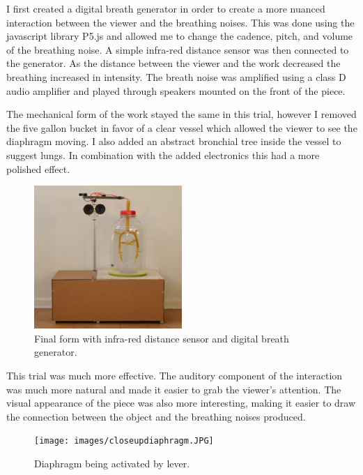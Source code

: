 \documentclass[letterpaper]{article}
\begin{document}
I first created a digital breath generator in order to create a more nuanced interaction between the viewer and the breathing noises. This was done using the javascript library P5.js and allowed me to change the cadence, pitch, and volume of the breathing noise. A simple infra-red distance sensor was then connected to the generator. As the distance between the viewer and the work decreased the breathing increased in intensity. The breath noise was amplified using a class D audio amplifier and played through speakers mounted on the front of the piece. 
 

The mechanical form of the work stayed the same in this trial, however I removed the five gallon bucket in favor of a clear vessel which allowed the viewer to see the diaphragm moving. I also added an abstract bronchial tree inside the vessel to suggest lungs. In combination with the added electronics this had a more polished effect.

\begin{figure}[h]
\includegraphics[width=0.5\textwidth]{images/finaltrial.JPG}
\caption{Final form with infra-red distance sensor and digital breath generator.}
\end{figure}


This trial was much more effective. The auditory component of the interaction was much more natural and made it easier to grab the viewer's attention. The visual appearance of the piece was also more interesting, making it easier to draw the connection between the object and the breathing noises produced. 

\begin{figure}[h]
\texttt{[image: images/closeupdiaphragm.JPG]}
\caption{Diaphragm being activated by lever.}
  \label{fig:denki}
\end{figure}
\end{document}

